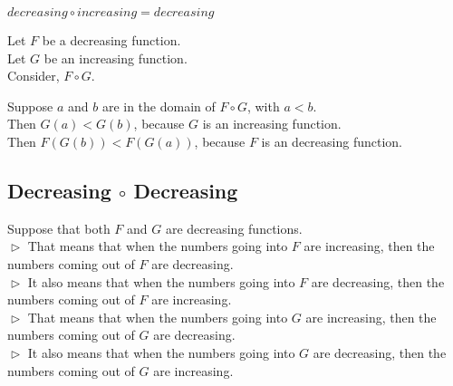 \documentclass{ximera}
\begin{document}
\begin{fact}
$decreasing \circ increasing = decreasing$


Let $F$ be a decreasing function. \\
Let $G$ be an increasing function. \\


Consider, $F \circ G$.

Suppose $a$ and $b$ are in the domain of $F \circ G$, with $a < b$. \\

Then $G(a) < G(b)$, because $G$ is an increasing function. \\

Then $F(G(b)) < F(G(a))$, because $F$ is an decreasing function.


\end{fact}






















\subsection{Decreasing $\circ$ Decreasing}


Suppose that both $F$ and $G$ are decreasing functions. \\

$\vartriangleright$ That means that when the numbers going into $F$ are increasing, then the numbers coming out of $F$ are decreasing. \\


$\vartriangleright$ It also means that when the numbers going into $F$ are decreasing, then the numbers coming out of $F$ are increasing. \\


$\vartriangleright$ That means that when the numbers going into $G$ are increasing, then the numbers coming out of $G$ are decreasing. \\



$\vartriangleright$ It also means that when the numbers going into $G$ are decreasing, then the numbers coming out of $G$ are increasing. \\
\end{document}
